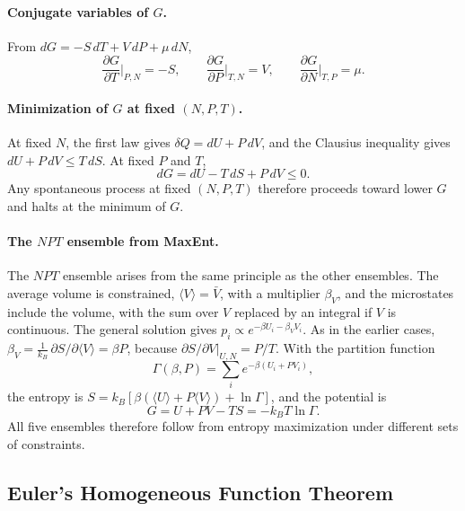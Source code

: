 \paragraph{Conjugate variables of $G$.}
From $dG=-S\,dT+V\,dP+\mu\,dN$,
\begin{equation}
    \boxed{\frac{\partial G}{\partial T}\bigg|_{P,N}=-S,\qquad
    \frac{\partial G}{\partial P}\bigg|_{T,N}=V,\qquad
    \frac{\partial G}{\partial N}\bigg|_{T,P}=\mu.}
\end{equation}

\paragraph{Minimization of $G$ at fixed $(N,P,T)$.}
At fixed $N$, the first law gives $\delta Q=dU+P\,dV$, and the Clausius
inequality gives $dU+P\,dV\leq T\,dS$. At fixed $P$ and $T$,
\begin{equation}
    \boxed{dG=dU-T\,dS+P\,dV\leq0.}
\end{equation}
Any spontaneous process at fixed $(N,P,T)$ therefore proceeds toward lower
$G$ and halts at the minimum of $G$.

\paragraph{The $NPT$ ensemble from MaxEnt.}
The $NPT$ ensemble arises from the same principle as the other ensembles.
The average volume is constrained, $\langle V\rangle=\bar V$, with a
multiplier $\beta_V$, and the microstates include the volume, with the sum
over $V$ replaced by an integral if $V$ is continuous. The general solution
gives $p_i\propto e^{-\beta U_i-\beta_V V_i}$. As in the earlier cases,
$\beta_V=\frac{1}{k_B}\,\partial S/\partial\langle V\rangle=\beta P$, because
$\partial S/\partial V|_{U,N}=P/T$. With the partition function
\begin{equation*}
    \Gamma(\beta,P)=\sum_i e^{-\beta(U_i+PV_i)},
\end{equation*}
the entropy is $S=k_B[\beta(\langle U\rangle+P\langle V\rangle)+\ln\Gamma]$,
and the potential is
\begin{equation}
    \boxed{G=U+PV-TS=-k_BT\ln\Gamma.}
\end{equation}
All five ensembles therefore follow from entropy maximization under
different sets of constraints.

\subsection{Euler's Homogeneous Function Theorem}

